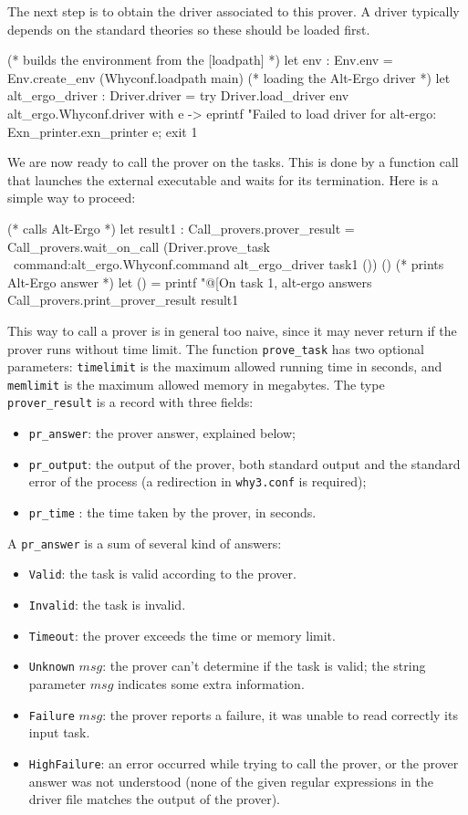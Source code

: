 The next step is to obtain the driver associated to this prover. A
driver typically depends on the standard theories so these should be
loaded first.
\begin{ocamlcode}
(* builds the environment from the [loadpath] *)
let env : Env.env =
  Env.create_env (Whyconf.loadpath main)
(* loading the Alt-Ergo driver *)
let alt_ergo_driver : Driver.driver =
  try
    Driver.load_driver env alt_ergo.Whyconf.driver
  with e ->
    eprintf "Failed to load driver for alt-ergo: %
      Exn_printer.exn_printer e;
    exit 1
\end{ocamlcode}

We are now ready to call the prover on the tasks. This is done by a
function call that launches the external executable and waits for its
termination. Here is a simple way to proceed:
\begin{ocamlcode}
(* calls Alt-Ergo *)
let result1 : Call_provers.prover_result =
  Call_provers.wait_on_call
    (Driver.prove_task ~command:alt_ergo.Whyconf.command
    alt_ergo_driver task1 ()) ()
(* prints Alt-Ergo answer *)
let () = printf "@[On task 1, alt-ergo answers %
  Call_provers.print_prover_result result1
\end{ocamlcode}
This way to call a prover is in general too naive, since it may never
return if the prover runs without time limit. The function
\texttt{prove\_task} has two optional parameters: \texttt{timelimit}
is the maximum allowed running time in seconds, and \texttt{memlimit}
is the maximum allowed memory in megabytes.  The type
\texttt{prover\_result} is a record with three fields:
\begin{itemize}
\item \texttt{pr\_answer}: the prover answer, explained below;
\item \texttt{pr\_output}: the output of the prover, \ie both
  standard output and the standard error of the process
  (a redirection in \texttt{why3.conf} is required);
\item \texttt{pr\_time} : the time taken by the prover, in seconds.
\end{itemize}
A \texttt{pr\_answer} is a sum of several kind of answers:
\begin{itemize}
\item \texttt{Valid}: the task is valid according to the prover.
\item \texttt{Invalid}: the task is invalid.
\item \texttt{Timeout}: the prover exceeds the time or memory limit.
\item \texttt{Unknown} $msg$: the prover can't determine if the task
  is valid; the string parameter $msg$ indicates some extra
  information.
\item \texttt{Failure} $msg$: the prover reports a failure, \ie it
  was unable to read correctly its input task.
\item \texttt{HighFailure}: an error occurred while trying to call the
  prover, or the prover answer was not understood (\ie none of the
  given regular expressions in the driver file matches the output
  of the prover).
\end{itemize}
